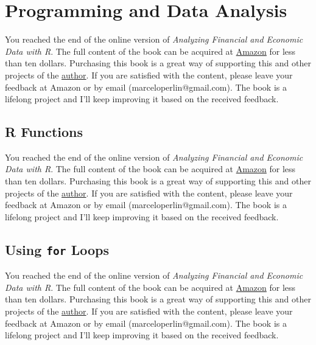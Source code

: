 \documentclass[
  12pt,
]{book}
\newenvironment{pleasebuyit}
{\begin{noteblock}
		
	} {\end{noteblock}}
\begin{document}
\hypertarget{programming}{%
\chapter{Programming and Data Analysis}\label{programming}}

\begin{pleasebuyit}
You reached the end of the online version of \emph{Analyzing Financial
and Economic Data with R}. The full content of the book can be acquired
at \href{https://www.amazon.com/dp/B084LSNXMN}{Amazon} for less than ten
dollars. Purchasing this book is a great way of supporting this and
other projects of the \href{https://www.msperlin.com/}{author}. If you
are satisfied with the content, please leave your feedback at Amazon or
by email (marceloperlin@gmail.com). The book is a lifelong project and
I'll keep improving it based on the received feedback.
\end{pleasebuyit}

\hypertarget{r-functions}{%
\section{R Functions}\label{r-functions}}

\begin{pleasebuyit}
You reached the end of the online version of \emph{Analyzing Financial
and Economic Data with R}. The full content of the book can be acquired
at \href{https://www.amazon.com/dp/B084LSNXMN}{Amazon} for less than ten
dollars. Purchasing this book is a great way of supporting this and
other projects of the \href{https://www.msperlin.com/}{author}. If you
are satisfied with the content, please leave your feedback at Amazon or
by email (marceloperlin@gmail.com). The book is a lifelong project and
I'll keep improving it based on the received feedback.
\end{pleasebuyit}

\hypertarget{using-for-loops}{%
\section{\texorpdfstring{Using \texttt{for} Loops}{Using for Loops}}\label{using-for-loops}}

\begin{pleasebuyit}
You reached the end of the online version of \emph{Analyzing Financial
and Economic Data with R}. The full content of the book can be acquired
at \href{https://www.amazon.com/dp/B084LSNXMN}{Amazon} for less than ten
dollars. Purchasing this book is a great way of supporting this and
other projects of the \href{https://www.msperlin.com/}{author}. If you
are satisfied with the content, please leave your feedback at Amazon or
by email (marceloperlin@gmail.com). The book is a lifelong project and
I'll keep improving it based on the received feedback.
\end{pleasebuyit}
\end{document}
